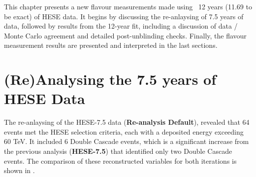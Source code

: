 This chapter presents a new flavour measurements made using ~12 years (11.69 to be exact) of HESE data. It begins by discussing the re-anlaysing of 7.5 years of data, followed by results from the 12-year fit, including a discussion of data / Monte Carlo agreement and detailed post-unblinding checks. Finally, the flavour measurement results are presented and interpreted in the last sections.

\section{(Re)Analysing the 7.5 years of HESE Data}
\label{sec:HESE7}
The re-anlaysing of the HESE-7.5 data (\textbf{Re-analysis Default}), revealed that 64 events met the HESE selection criteria, each with a deposited energy exceeding 60 TeV. It included 6 Double Cascade events, which is a significant increase from the previous analysis (\textbf{HESE-7.5}) that identified only two Double Cascade events. The comparison of these reconstructed variables for both iterations is shown in . 

